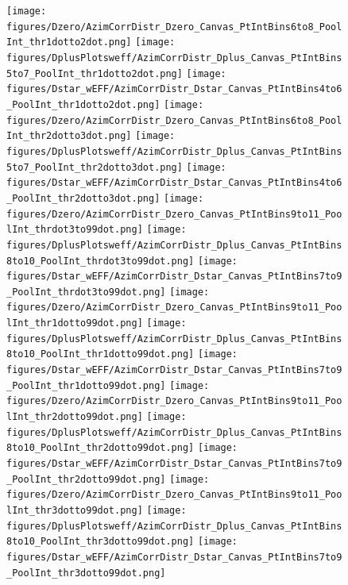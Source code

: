 \begin{figure}[!htbp]
\centering
{\texttt{[image: figures/Dzero/AzimCorrDistr\_Dzero\_Canvas\_PtIntBins6to8\_PoolInt\_thr1dotto2dot.png]}}
{\texttt{[image: figures/DplusPlotsweff/AzimCorrDistr\_Dplus\_Canvas\_PtIntBins5to7\_PoolInt\_thr1dotto2dot.png]}}
{\texttt{[image: figures/Dstar\_wEFF/AzimCorrDistr\_Dstar\_Canvas\_PtIntBins4to6\_PoolInt\_thr1dotto2dot.png]}}
{\texttt{[image: figures/Dzero/AzimCorrDistr\_Dzero\_Canvas\_PtIntBins6to8\_PoolInt\_thr2dotto3dot.png]}}
{\texttt{[image: figures/DplusPlotsweff/AzimCorrDistr\_Dplus\_Canvas\_PtIntBins5to7\_PoolInt\_thr2dotto3dot.png]}}
{\texttt{[image: figures/Dstar\_wEFF/AzimCorrDistr\_Dstar\_Canvas\_PtIntBins4to6\_PoolInt\_thr2dotto3dot.png]}}
{\texttt{[image: figures/Dzero/AzimCorrDistr\_Dzero\_Canvas\_PtIntBins9to11\_PoolInt\_thrdot3to99dot.png]}}
{\texttt{[image: figures/DplusPlotsweff/AzimCorrDistr\_Dplus\_Canvas\_PtIntBins8to10\_PoolInt\_thrdot3to99dot.png]}}
{\texttt{[image: figures/Dstar\_wEFF/AzimCorrDistr\_Dstar\_Canvas\_PtIntBins7to9\_PoolInt\_thrdot3to99dot.png]}}
{\texttt{[image: figures/Dzero/AzimCorrDistr\_Dzero\_Canvas\_PtIntBins9to11\_PoolInt\_thr1dotto99dot.png]}}
{\texttt{[image: figures/DplusPlotsweff/AzimCorrDistr\_Dplus\_Canvas\_PtIntBins8to10\_PoolInt\_thr1dotto99dot.png]}}
{\texttt{[image: figures/Dstar\_wEFF/AzimCorrDistr\_Dstar\_Canvas\_PtIntBins7to9\_PoolInt\_thr1dotto99dot.png]}}
{\texttt{[image: figures/Dzero/AzimCorrDistr\_Dzero\_Canvas\_PtIntBins9to11\_PoolInt\_thr2dotto99dot.png]}}
{\texttt{[image: figures/DplusPlotsweff/AzimCorrDistr\_Dplus\_Canvas\_PtIntBins8to10\_PoolInt\_thr2dotto99dot.png]}}
{\texttt{[image: figures/Dstar\_wEFF/AzimCorrDistr\_Dstar\_Canvas\_PtIntBins7to9\_PoolInt\_thr2dotto99dot.png]}}
{\texttt{[image: figures/Dzero/AzimCorrDistr\_Dzero\_Canvas\_PtIntBins9to11\_PoolInt\_thr3dotto99dot.png]}}
{\texttt{[image: figures/DplusPlotsweff/AzimCorrDistr\_Dplus\_Canvas\_PtIntBins8to10\_PoolInt\_thr3dotto99dot.png]}}
{\texttt{[image: figures/Dstar\_wEFF/AzimCorrDistr\_Dstar\_Canvas\_PtIntBins7to9\_PoolInt\_thr3dotto99dot.png]}}
\end{figure}
